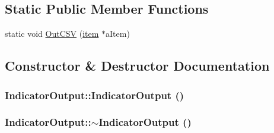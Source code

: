 \subsection*{Static Public Member Functions}
\begin{DoxyCompactItemize}
\item 
static void \hyperlink{class_indicator_output_a72be7008e52ebb04fedbffad9b75ae74}{OutCSV} (\hyperlink{classitem}{item} $\ast$aItem)
\end{DoxyCompactItemize}


\subsection{Constructor \& Destructor Documentation}
\hypertarget{class_indicator_output_a16d7c595d15f04e8234858ff6cb2b82d}{
\subsubsection[{IndicatorOutput}]{\setlength{\rightskip}{0pt plus 5cm}IndicatorOutput::IndicatorOutput ()}}
\label{class_indicator_output_a16d7c595d15f04e8234858ff6cb2b82d}
\hypertarget{class_indicator_output_a48fb1af294aefcf7bbcdc4e9f1b04c57}{
\subsubsection[{$\sim$IndicatorOutput}]{\setlength{\rightskip}{0pt plus 5cm}IndicatorOutput::$\sim$IndicatorOutput ()}}
\label{class_indicator_output_a48fb1af294aefcf7bbcdc4e9f1b04c57}


